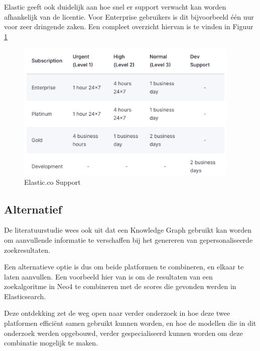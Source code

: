 Elastic geeft ook duidelijk aan hoe snel er support verwacht kan worden afhankelijk van de licentie. Voor Enterprise gebruikers is dit bijvoorbeeld één uur voor zeer dringende zaken. 
Een compleet overzicht hiervan is te vinden in Figuur \ref{fig:elasticSupport}

\begin{figure} [ht]
	\centering
	\includegraphics[width=0.95\textwidth]{img/elastic-support}
	\caption{Elastic.co Support}
	\label{fig:elasticSupport}
\end{figure}



\subsection{Alternatief}
De literatuurstudie wees ook uit dat een Knowledge Graph gebruikt kan worden om aanvullende informatie te verschaffen bij het genereren van gepersonaliseerde zoekresultaten. 

Een alternatieve optie is dus om beide platformen te combineren, en elkaar te laten aanvullen. Een voorbeeld hier van is om de resultaten van een zoekalgoritme in Neo4 te combineren met de scores die gevonden werden in Elasticsearch. 

Deze ontdekking zet de weg open naar verder onderzoek in hoe deze twee platformen efficiënt samen gebruikt kunnen worden, en hoe de modellen die in dit onderzoek werden opgebouwd, verder gespecialiseerd kunnen worden om deze combinatie mogelijk te maken. 
